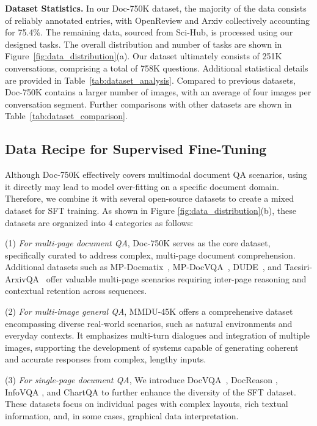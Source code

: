 \documentclass[10pt,twocolumn,letterpaper]{article}
\def\dataname{Doc-750K\xspace}
\begin{document}
\begin{CJK}{UTF8}{gbsn}
\noindent\textbf{Dataset Statistics.}
In our {\dataname} dataset, the majority of the data consists of reliably annotated entries, with OpenReview and Arxiv collectively accounting for 75.4\%. The remaining data, sourced from Sci-Hub, is processed using our designed tasks. The overall distribution and number of tasks are shown in Figure~\ref{fig:data_distribution}(a).
Our dataset ultimately consists of 251K conversations, comprising a total of 758K questions. Additional statistical details are provided in Table~\ref{tab:dataset_analysis}. Compared to previous datasets, {\dataname} contains a larger number of images, with an average of four images per conversation segment. Further comparisons with other datasets are shown in Table~\ref{tab:dataset_comparison}.




\subsection{Data Recipe for Supervised Fine-Tuning}

Although \dataname effectively covers multimodal document QA scenarios, using it directly may lead to model over-fitting on a specific document domain. Therefore, we combine it with several open-source datasets to create a mixed dataset for SFT training.
As shown in Figure \ref{fig:data_distribution}(b), these datasets are organized into 4 categories as follows:

 (1) \emph{For multi-page document QA}, \dataname serves as the core dataset, specifically curated to address complex, multi-page document comprehension. Additional datasets such as MP-Docmatix~\cite{laurenccon2024docmatix}, MP-DocVQA~\cite{mathew2021docvqa}, DUDE~\cite{van2023document}, and Taesiri-ArxivQA~\cite{arxivqa}
offer valuable multi-page scenarios requiring inter-page reasoning and contextual retention across sequences. 

 (2) \emph{For multi-image general QA}, MMDU-45K \cite{liu2024mmdu} offers a comprehensive dataset encompassing diverse real-world scenarios, such as natural environments and everyday contexts. It emphasizes multi-turn dialogues and integration of multiple images, supporting the development of systems capable of generating coherent and accurate responses from complex, lengthy inputs.

(3) \emph{For single-page document QA}, We introduce DocVQA~\cite{mathew2021docvqa}, DocReason \cite{ye2023mplugdocowl}, InfoVQA \cite{mathew2022infographicvqa}, and ChartQA \cite{masry2022chartqa} to further enhance the diversity of the SFT dataset.
These datasets focus on individual pages with complex layouts, rich textual information, and, in some cases, graphical data interpretation.


\end{CJK}
\end{document}
